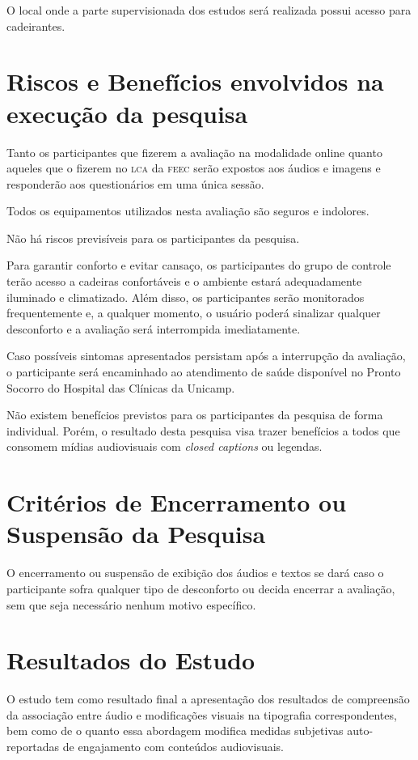 \documentclass[a4paper,11pt,titlepage,singlespacing]{article}
\begin{document}
O local onde a parte supervisionada dos estudos será realizada possui acesso para cadeirantes.

\section{Riscos e Benefícios envolvidos na execução da pesquisa}
\noindent Tanto os participantes que fizerem a avaliação na modalidade online quanto aqueles que o fizerem no \textsc{lca} da \textsc{feec} serão expostos aos áudios e imagens e responderão aos questionários em uma única sessão.

Todos os equipamentos utilizados nesta avaliação são seguros e indolores. 

Não há riscos previsíveis para os participantes da pesquisa.

Para garantir conforto e evitar cansaço, os participantes do grupo de controle terão acesso a cadeiras confortáveis e o ambiente estará adequadamente iluminado e climatizado. Além disso, os participantes serão monitorados frequentemente e, a qualquer momento, o usuário poderá sinalizar qualquer desconforto e a avaliação será interrompida imediatamente. 

Caso possíveis sintomas apresentados persistam após a interrupção da avaliação, o participante será encaminhado ao atendimento de saúde disponível no Pronto Socorro do Hospital das Clínicas da Unicamp.%

Não existem benefícios previstos para os participantes da pesquisa de forma individual. Porém, o resultado desta pesquisa visa trazer benefícios a todos que consomem mídias audiovisuais com \textit{closed captions} ou legendas.

\section{Critérios de Encerramento ou Suspensão da Pesquisa}
\noindent O encerramento ou suspensão de exibição dos áudios e textos se dará caso o participante sofra qualquer tipo de desconforto ou decida encerrar a avaliação, sem que seja necessário nenhum motivo específico. 

\section{Resultados do Estudo}
\noindent O estudo tem como resultado final a apresentação dos resultados de compreensão da associação entre áudio e modificações visuais na tipografia correspondentes, bem como de o quanto essa abordagem modifica medidas subjetivas auto-reportadas de engajamento com conteúdos audiovisuais.
\end{document}
